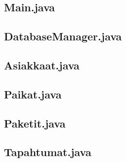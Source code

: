 \documentclass[11pt,a4paper]{article}
\begin{document}
\subsection*{Main.java}
% 
\newpage

\subsection*{DatabaseManager.java}
% 
\newpage

\subsection*{Asiakkaat.java}
% 
\newpage

\subsection*{Paikat.java}
% 
\newpage

\subsection*{Paketit.java}
% 
\newpage

\subsection*{Tapahtumat.java}
% 
\end{document}
